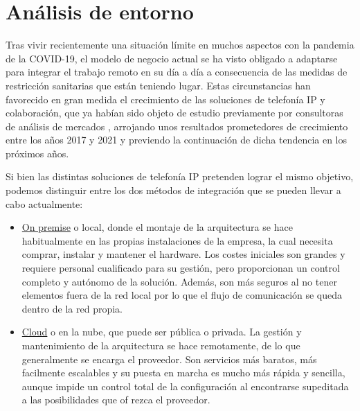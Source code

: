 \documentclass[a4paper, 12pt]{book}
\begin{document}
\section{Análisis de entorno}
Tras vivir recientemente una situación límite en muchos aspectos con la pandemia de la COVID-19, el modelo de negocio actual se ha visto obligado a adaptarse para integrar el trabajo remoto en su día a día a consecuencia de las medidas de restricción sanitarias que están teniendo lugar.
Estas circunstancias han favorecido en gran medida el crecimiento de las soluciones de telefonía IP y colaboración, que ya habían sido objeto de estudio previamente por consultoras de análisis de mercados %
, arrojando unos resultados prometedores de crecimiento entre los años 2017 y 2021 y previendo la continuación de dicha tendencia en los próximos años.

Si bien las distintas soluciones de telefonía IP pretenden lograr el mismo objetivo, podemos distinguir entre los dos métodos de integración que se pueden llevar a cabo actualmente:
\begin{itemize}
  \renewcommand{\theenumi}{\alph{enumi}}
  \item \underline{On premise} o local, donde el montaje de la arquitectura se hace habitualmente en las propias instalaciones de la empresa, la cual necesita comprar, instalar y mantener el hardware. Los costes iniciales son grandes y requiere personal cualificado para su gestión, pero proporcionan un control completo y autónomo de la solución. Además, son más seguros al no tener elementos fuera de la red local por lo que el flujo de comunicación se queda dentro de la red propia.  

  \item \underline{Cloud} o en la nube, que puede ser pública o privada. La gestión y mantenimiento de la arquitectura se hace remotamente, de lo que generalmente se encarga el proveedor. Son servicios más baratos, más facilmente escalables y su puesta en marcha es mucho más rápida y sencilla, aunque impide un control total de la configuración al encontrarse supeditada a las posibilidades que of rezca el proveedor.
\end{itemize}
\end{document}
